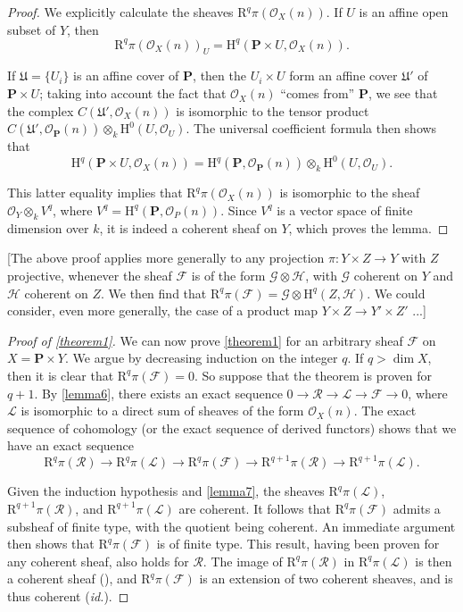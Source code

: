 \documentclass{article}
\theoremstyle{plain}
\theoremstyle{definition}
\newcommand{\sh}[1]{{\mathscr{#1}}}
\newcommand{\HH}{\mathrm{H}}
\newcommand{\RR}{\mathrm{R}}
\newcommand{\PP}{\mathbf{P}}
\newcommand{\oldpage}[1]{\marginpar{\footnotesize$\Big\vert$ \textit{p.~#1}}}
\begin{document}
\begin{proof}
  We explicitly calculate the sheaves $\RR^q\pi(\sh{O}_X(n))$.
  If $U$ is an affine open
  \oldpage{104}
  subset of $Y$, then
  \[
    \RR^q\pi(\sh{O}_X(n))_U = \HH^q(\PP\times U,\sh{O}_X(n)).
  \]

  If $\mathfrak{U}=\{U_i\}$ is an affine cover of $\PP$, then the $U_i\times U$ form an affine cover $\mathfrak{U}'$ of $\PP\times U$;
  taking into account the fact that $\sh{O}_X(n)$ ``comes from'' $\PP$, we see that the complex $C(\mathfrak{U}',\sh{O}_X(n))$ is isomorphic to the tensor product $C(\mathfrak{U}',\sh{O}_{\PP}(n))\otimes_k\HH^0(U,\sh{O}_U)$.
  The universal coefficient formula then shows that
  \[
    \HH^q(\PP\times U,\sh{O}_X(n)) = \HH^q(\PP,\sh{O}_{\PP}(n))\otimes_k\HH^0(U,\sh{O}_U).
  \]

  This latter equality implies that $\RR^q\pi(\sh{O}_X(n))$ is isomorphic to the sheaf $\sh{O}_Y\otimes_k V^q$, where $V^q=\HH^q(\PP,\sh{O}_P(n))$.
  Since $V^q$ is a vector space of finite dimension over $k$, it is indeed a coherent sheaf on $Y$, which proves the lemma.
\end{proof}

  [The above proof applies more generally to any projection $\pi\colon Y\times Z\to Y$ with $Z$ projective, whenever the sheaf $\sh{F}$ is of the form $\sh{G}\otimes\sh{H}$, with $\sh{G}$ coherent on $Y$ and $\sh{H}$ coherent on $Z$.
  We then find that $\RR^q\pi(\sh{F})=\sh{G}\otimes\HH^q(Z,\sh{H})$.
  We could consider, even more generally, the case of a product map $Y\times Z\to Y'\times Z'$ ...]

\begin{proof}[Proof of \cref{theorem1}]
  We can now prove \cref{theorem1} for an arbitrary sheaf $\sh{F}$ on $X=\PP\times Y$.
  We argue by decreasing induction on the integer $q$.
  If $q>\dim X$, then it is clear that $\RR^q\pi(\sh{F})=0$.
  So suppose that the theorem is proven for $q+1$.
  By \cref{lemma6}, there exists an exact sequence $0\to\sh{R}\to\sh{L}\to\sh{F}\to0$, where $\sh{L}$ is isomorphic to a direct sum of sheaves of the form $\sh{O}_X(n)$.
  The exact sequence of cohomology (or the exact sequence of derived functors) shows that we have an exact sequence
  \[
    \RR^q\pi(\sh{R}) \to
    \RR^q\pi(\sh{L}) \to
    \RR^q\pi(\sh{F}) \to
    \RR^{q+1}\pi(\sh{R}) \to
    \RR^{q+1}\pi(\sh{L}).
  \]

  Given the induction hypothesis and \cref{lemma7}, the sheaves $\RR^q\pi(\sh{L})$, $\RR^{q+1}\pi(\sh{R})$, and $\RR^{q+1}\pi(\sh{L})$ are coherent.
  It follows that $\RR^q\pi(\sh{F})$ admits a subsheaf of finite type, with the quotient being coherent.
  An immediate argument then shows that $\RR^q\pi(\sh{F})$ is of finite type.
  This result, having been proven for any coherent sheaf, also holds for $\sh{R}$.
  The image of $\RR^q\pi(\sh{R})$ in $\RR^q\pi(\sh{L})$ is then a coherent sheaf (\cite[p.~208]{12}), and $\RR^q\pi(\sh{F})$ is an extension of two coherent sheaves, and is thus coherent (\emph{id.}).
\end{proof}
\end{document}
